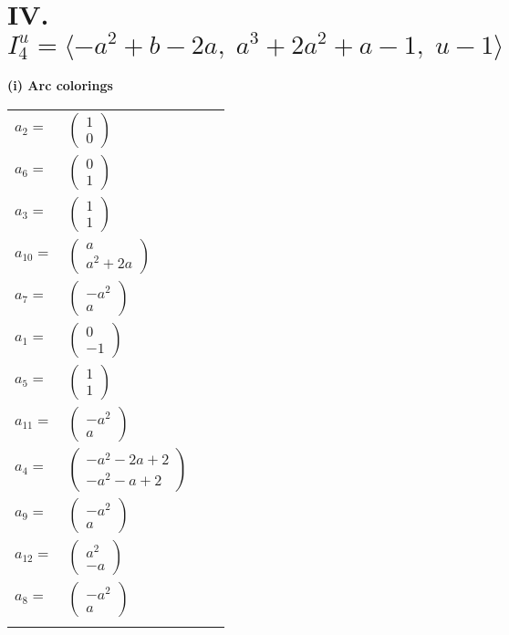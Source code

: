 \documentclass[1p]{elsarticle_modified}
\theoremstyle{definition}
\begin{document}
\centering \section*{IV. $I^u_{4}= \langle - a^2+b-2 a,\;a^3+2 a^2+a-1,\;u-1 \rangle$}
\flushleft \textbf{(i) Arc colorings}\\
\begin{tabular}{m{7pt} m{180pt} m{7pt} m{180pt} }
\flushright $a_{2}=$&$\begin{pmatrix}1\\0\end{pmatrix}$ \\
\flushright $a_{6}=$&$\begin{pmatrix}0\\1\end{pmatrix}$ \\
\flushright $a_{3}=$&$\begin{pmatrix}1\\1\end{pmatrix}$ \\
\flushright $a_{10}=$&$\begin{pmatrix}a\\a^2+2 a\end{pmatrix}$ \\
\flushright $a_{7}=$&$\begin{pmatrix}- a^2\\a\end{pmatrix}$ \\
\flushright $a_{1}=$&$\begin{pmatrix}0\\-1\end{pmatrix}$ \\
\flushright $a_{5}=$&$\begin{pmatrix}1\\1\end{pmatrix}$ \\
\flushright $a_{11}=$&$\begin{pmatrix}- a^2\\a\end{pmatrix}$ \\
\flushright $a_{4}=$&$\begin{pmatrix}- a^2-2 a+2\\- a^2- a+2\end{pmatrix}$ \\
\flushright $a_{9}=$&$\begin{pmatrix}- a^2\\a\end{pmatrix}$ \\
\flushright $a_{12}=$&$\begin{pmatrix}a^2\\- a\end{pmatrix}$ \\
\flushright $a_{8}=$&$\begin{pmatrix}- a^2\\a\end{pmatrix}$\\&\end{tabular}
\end{document}
